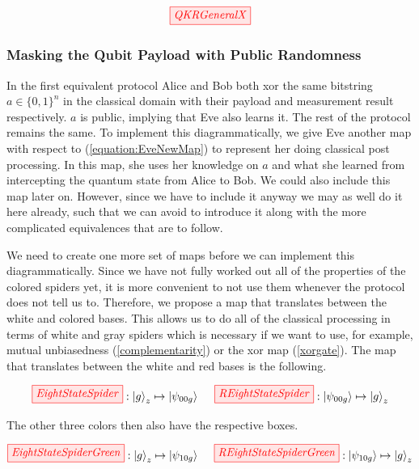 \documentclass[]{article}
\begin{document}
\begin{equation}
\label{equation:QKRGeneral}
	\tikzfig{QKRGeneralX}
\end{equation}


\subsubsection{Masking the Qubit Payload with Public Randomness}
\label{section:maskingqubitpubrand}
In the first equivalent protocol Alice and Bob both xor the same bitstring $a \in \{0,1\}^n$ in the classical domain with their payload and measurement result respectively. $a$ is public, implying that Eve also learns it. The rest of the protocol remains the same. To implement this diagrammatically, we give Eve another map with respect to (\ref{equation:EveNewMap}) to represent her doing classical post processing. In this map, she uses her knowledge on $a$ and what she learned from intercepting the quantum state from Alice to Bob. We could also include this map later on. However, since we have to include it anyway we may as well do it here already, such that we can avoid to introduce it along with the more complicated equivalences that are to follow.

We need to create one more set of maps before we can implement this diagrammatically. Since we have not fully worked out all of the properties of the colored spiders yet, it is more convenient to not use them whenever the protocol does not tell us to. Therefore, we propose a map that translates between the white and colored bases. This allows us to do all of the classical processing in terms of white and gray spiders which is necessary if we want to use, for example, mutual unbiasedness (\ref{complementarity}) or the xor map (\ref{xorgate}). The map that translates between the white and red bases is the following.

\begin{equation}
\label{equation:EightStateSpider}
\tikzfig{EightStateSpider} :
\ket{g}_z \mapsto \ket{\psi_{00g}} ~~~~ \tikzfig{REightStateSpider} :
\ket{\psi_{00g}} \mapsto \ket{g}_z
\end{equation}

The other three colors then also have the respective boxes.

\begin{equation}
\label{equation:EightStateSpiderGreen}
\tikzfig{EightStateSpiderGreen} :
\ket{g}_z \mapsto \ket{\psi_{10g}} ~~~~ \tikzfig{REightStateSpiderGreen} :
\ket{\psi_{10g}} \mapsto \ket{g}_z
\end{equation}
\end{document}
